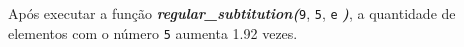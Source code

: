 \documentclass[12pt,varwidth=16cm,border=1pt]{standalone}
\begin{document}
Após executar a função \textbf{\textit{regular\_subtitution(}}\verb+9+, \verb+5+, \verb+e+ \textbf{\textit{)}}, a quantidade de elementos com o número \verb+5+ aumenta 1.92 vezes.

\questiomfalse
\end{document}
